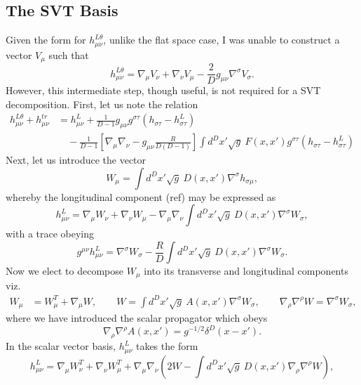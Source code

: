 \documentclass[10pt,letterpaper]{article}
\numberwithin{equation}{subsection}
\begin{document}
\subsection{The SVT Basis}
Given the form for $h_{\mu\nu}^{L\theta}$, unlike the flat space case, I was unable to construct a vector $V_\mu$ such that
\begin{equation}
h_{\mu\nu}^{L\theta} = \nabla_\mu V_\nu + \nabla_\nu V_\mu -\frac{2}{D}g_{\mu\nu} \nabla^\sigma V_\sigma. 
\end{equation}
However, this intermediate step, though useful, is not required for a SVT decomposition.
First, let us note the relation
\begin{align}
h_{\mu\nu}^{L\theta} + h^{tr}_{\mu\nu} &= h_{\mu\nu}^L+ \frac{1}{D-1} g_{\mu\nu} g^{\sigma\tau}(h_{\sigma\tau}-h^L_{\sigma\tau})
\nonumber\\
&\quad -\frac{1}{D-1}
\left[ \nabla_\mu\nabla_\nu- g_{\mu\nu}\frac{R}{D(D-1)}\right] \int d^Dx' \sqrt{g}\ F(x,x')g^{\sigma\tau}(h_{\sigma\tau}-h_{\sigma\tau}^L)
\end{align}
Next, let us introduce the vector
\begin{equation}
W_{\mu} = \int d^Dx' \sqrt{g}\ D(x,x')\nabla^\sigma h_{\sigma\mu},
\end{equation}
whereby the longitudinal component (ref) may be expressed as
\begin{equation}
h_{\mu\nu}^L = \nabla_\mu W_\nu + \nabla_\nu W_\mu - \nabla_\mu\nabla_\nu \int d^Dx' \sqrt{g}\ D(x,x')\nabla^\sigma W_\sigma,
\end{equation}
with a trace obeying
\begin{equation}
g^{\mu\nu}h_{\mu\nu}^{L} = \nabla^\sigma W_\sigma - \frac{R}{D} \int d^Dx' \sqrt{g}\ D(x,x')\nabla^\sigma W_\sigma.
\end{equation}
Now we elect to decompose $W_{\mu}$ into its transverse and longitudinal components viz. 
\begin{align}
W_\mu &= W_\mu^T + \nabla_\mu W,\qquad W = \int d^Dx' \sqrt{g}\ A(x,x')\nabla^\sigma W_\sigma, 
\qquad \nabla_\rho \nabla^\rho W = \nabla^\sigma W_\sigma,
\end{align}
where we have introduced the scalar propagator which obeys
\begin{equation}
 \nabla_\rho \nabla^\rho A(x,x') = g^{-1/2}\delta^D(x-x').
\end{equation}
In the scalar vector basis, $h^L_{\mu\nu}$ takes the form
\begin{equation}
h_{\mu\nu}^L =\nabla_\mu W^T_\nu + \nabla_\nu W^T_\mu + \nabla_\mu\nabla_\nu\left( 2W-\int d^Dx' \sqrt{g}\ D(x,x')\nabla_\rho \nabla^\rho W\right),
\end{equation}
\end{document}
